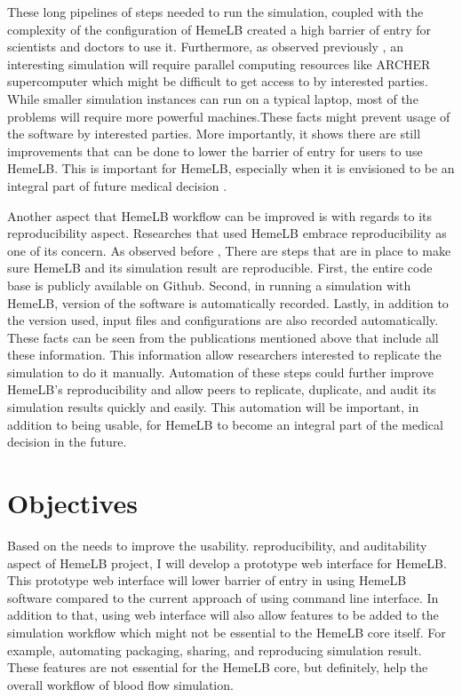 These long pipelines of steps needed to run the simulation, coupled with the complexity of the configuration of HemeLB created a high barrier of entry for scientists and doctors to use it. Furthermore, as observed previously \citep{Steven:2016aa}, an interesting simulation will require parallel computing resources like ARCHER supercomputer which might be difficult to get access to by interested parties. While smaller simulation instances can run on a typical laptop, most of the problems will require more powerful machines.These facts might prevent usage of the software by interested parties. More importantly, it shows there are still improvements that can be done to lower the barrier of entry for users to use HemeLB. This is important for HemeLB, especially when it is envisioned to be an integral part of future medical decision \citep{1_green_2014}.

Another aspect that HemeLB workflow can be improved is with regards to its reproducibility aspect. Researches that used HemeLB embrace reproducibility as one of its concern. As observed before \citep{Steven:2016aa}, There are steps that are in place to make sure HemeLB and its simulation result are reproducible. First, the entire code base is publicly available on Github. Second, in running a simulation with HemeLB, version of the software is automatically recorded. Lastly, in addition to the version used, input files and configurations are also recorded automatically. These facts can be seen from the publications mentioned above \citep{bernabeu2015characterization,itani2015automated,franco2015dynamic,franco2016non} that include all these information. This information allow researchers interested to replicate the simulation to do it manually. Automation of these steps could further improve HemeLB's reproducibility and allow peers to replicate, duplicate, and audit its simulation results quickly and easily. This automation will be important, in addition to being usable, for HemeLB to become an integral part of the medical decision in the future.

\section{Objectives}

Based on the needs to improve the usability. reproducibility, and auditability aspect of HemeLB project, I will develop a prototype web interface for HemeLB. This prototype web interface will lower barrier of entry in using HemeLB software compared to the current approach of using command line interface. In addition to that, using web interface will also allow features to be added to the simulation workflow which might not be essential to the HemeLB core itself. For example, automating packaging, sharing, and reproducing simulation result. These features are not essential for the HemeLB core, but definitely, help the overall workflow of blood flow simulation.

